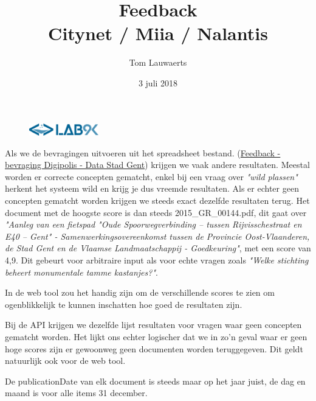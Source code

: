 \documentclass[11pt, letterpaper, oneside]{article}
\title{Feedback \\ Citynet / Miia / Nalantis}
\author{Tom Lauwaerts}
\date{3 juli 2018}
\begin{document}
	\begin{figure}
			\includegraphics[width=0.27\textwidth,keepaspectratio]{figuren/logo} %
	\end{figure}
	\vspace*{0.50cm}
	
	\noindent
	\fontsize{30pt}{18pt}\selectfont\textcolor{priColour}{\textbf{\@title}}\newline
	
	\fontsize{11pt}{15pt}\selectfont
	Als we de bevragingen uitvoeren uit het spreadsheet bestand. (\href{https://docs.google.com/spreadsheets/d/1eH3B7dC7MSjM5RJHtsiqMeepdzvHi-di5VJLD1ZBV-s/edit#gid=967764322}{Feedback - bevraging Digipolis - Data Stad Gent}) krijgen we vaak andere resultaten. Meestal worden er correcte concepten gematcht, enkel bij een vraag over \textit{"wild plassen"} herkent het systeem wild en krijg je dus vreemde resultaten. Als er echter geen concepten gematcht worden krijgen we steeds exact dezelfde resultaten terug. Het document met de hoogste score is dan steeds 2015\_GR\_00144.pdf, dit gaat over \textit{"Aanleg van een fietspad "Oude Spoorwegverbinding – tussen Rijvisschestraat en E40 – Gent" - Samenwerkingsovereenkomst tussen de Provincie Oost-Vlaanderen, de Stad Gent en de Vlaamse Landmaatschappij - Goedkeuring"}, met een score van 4,9. Dit gebeurt voor arbitraire input als voor echte vragen zoals \textit{"Welke stichting beheert monumentale tamme kastanjes?"}.
	
	In de web tool zou het handig zijn om de verschillende scores te zien om ogenblikkelijk te kunnen inschatten hoe goed de resultaten zijn.
	
	Bij de API krijgen we dezelfde lijst resultaten voor vragen waar geen concepten gematcht worden. Het lijkt ons echter logischer dat we in zo'n geval waar er geen hoge scores zijn er gewoonweg geen documenten worden teruggegeven. Dit geldt natuurlijk ook voor de web tool.
	
	De publicationDate van elk document is steeds maar op het jaar juist, de dag en maand is voor alle items 31 december.
\end{document}
